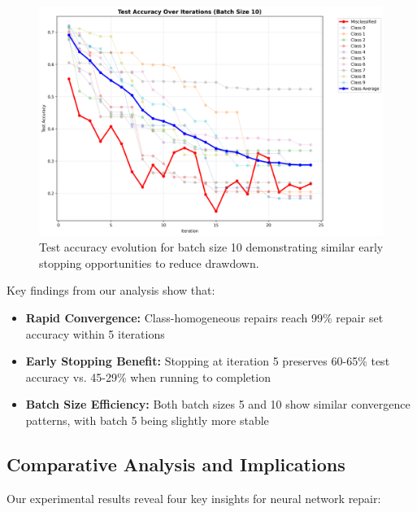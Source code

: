 \documentclass{article}
\begin{document}
\begin{figure}[h]
	\centering
	\includegraphics[width=\textwidth]{results/stochastic_analysis/batch_iterations/test_accuracy_batch_10.png}
	\caption{Test accuracy evolution for batch size 10 demonstrating similar early stopping opportunities to reduce drawdown.}
	\label{fig:early_stopping_batch_10}
\end{figure}

Key findings from our analysis show that:
\begin{itemize}
	\item \textbf{Rapid Convergence:} Class-homogeneous repairs reach 99\% repair set accuracy within 5 iterations
	\item \textbf{Early Stopping Benefit:} Stopping at iteration 5 preserves 60-65\% test accuracy vs. 45-29\% when running to completion
	\item \textbf{Batch Size Efficiency:} Both batch sizes 5 and 10 show similar convergence patterns, with batch 5 being slightly more stable
\end{itemize}

\subsection{Comparative Analysis and Implications}

Our experimental results reveal four key insights for neural network repair:
\end{document}

